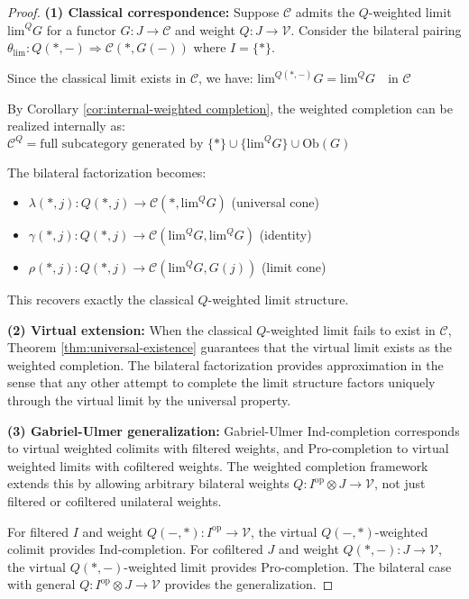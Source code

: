 \documentclass[11pt]{article}
\theoremstyle{plain}
\theoremstyle{definition}
\theoremstyle{remark}
\newcommand{\V}{\mathcal{V}}
\newcommand{\C}{\mathcal{C}}
\newcommand{\op}{\mathrm{op}}
\renewcommand{\lim}{\mathrm{lim}}
\begin{document}
\begin{proof}
\textbf{(1) Classical correspondence:} 
Suppose $\C$ admits the $Q$-weighted limit $\lim^Q G$ for a functor $G : J \to \C$ and weight $Q : J \to \V$. Consider the bilateral pairing $\theta_{\lim} : Q(\ast, -) \Rightarrow \C(\ast, G(-))$ where $I = \{\ast\}$.

Since the classical limit exists in $\C$, we have:
$\lim^{Q(\ast, -)} G = \lim^Q G \quad \text{in } \C$

By Corollary \ref{cor:internal-weighted completion}, the weighted completion can be realized internally as:
$\C^Q = \text{full subcategory generated by } \{\ast\} \cup \{\lim^Q G\} \cup \mathrm{Ob}(G)$

The bilateral factorization becomes:
\begin{itemize}
\item $\lambda(\ast, j) : Q(\ast, j) \to \C(\ast, \lim^Q G)$ (universal cone)
\item $\gamma(\ast, j) : Q(\ast, j) \to \C(\lim^Q G, \lim^Q G)$ (identity)
\item $\rho(\ast, j) : Q(\ast, j) \to \C(\lim^Q G, G(j))$ (limit cone)
\end{itemize}

This recovers exactly the classical $Q$-weighted limit structure.

\textbf{(2) Virtual extension:}
When the classical $Q$-weighted limit fails to exist in $\C$, Theorem \ref{thm:universal-existence} guarantees that the virtual limit exists as the weighted completion. The bilateral factorization provides approximation in the sense that any other attempt to complete the limit structure factors uniquely through the virtual limit by the universal property.

\textbf{(3) Gabriel-Ulmer generalization:}
Gabriel-Ulmer Ind-completion corresponds to virtual weighted colimits with filtered weights, and Pro-completion to virtual weighted limits with cofiltered weights. The weighted completion framework extends this by allowing arbitrary bilateral weights $Q : I^{\op} \otimes J \to \V$, not just filtered or cofiltered unilateral weights.

For filtered $I$ and weight $Q(-, \ast) : I^{\op} \to \V$, the virtual $Q(-, \ast)$-weighted colimit provides Ind-completion. For cofiltered $J$ and weight $Q(\ast, -) : J \to \V$, the virtual $Q(\ast, -)$-weighted limit provides Pro-completion. The bilateral case with general $Q : I^{\op} \otimes J \to \V$ provides the generalization.
\end{proof}
\end{document}
